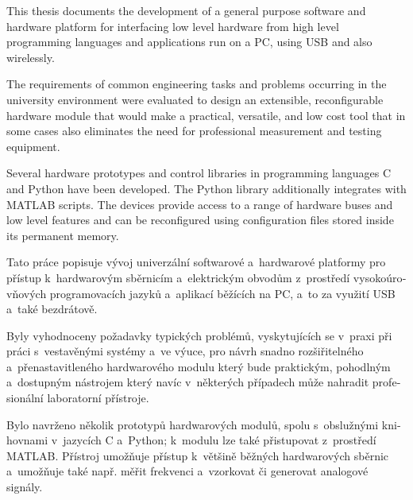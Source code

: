 
\begin{abstract-english}
This thesis documents the development of a general purpose software and hardware platform for interfacing low level hardware from high level programming languages and applications run on a PC, using USB and also wirelessly.

The requirements of common engineering tasks and problems occurring in the university environment were evaluated to design an extensible, reconfigurable hardware module that would make a practical, versatile, and low cost tool that in some cases also eliminates the need for professional measurement and testing equipment.

Several hardware prototypes and control libraries in programming languages C and Python have been developed. The Python library additionally integrates with MATLAB scripts. The devices provide access to a range of hardware buses and low level features and can be reconfigured using configuration files stored inside its permanent memory.
\end{abstract-english}

\begin{abstract-czech}
\begin{otherlanguage}{czech}
Tato práce popisuje vývoj univerzální softwarové a~hardwarové platformy pro přístup k~hardwarovým sběrnicím a~elektrickým obvodům z~prostředí vysokoúrovňových programovacích jazyků a~aplikací běžících na PC, a~to za využití USB a~také bezdrátově.

Byly vyhodnoceny požadavky typických problémů, vyskytujících se v~praxi při práci s~vestavěnými systémy a~ve výuce, pro návrh snadno rozšiřitelného a~přenastavitleného hardwarového modulu který bude praktickým, pohodlným a~dostupným nástrojem který navíc v~některých případech může nahradit profesionální laboratorní přístroje.

Bylo navrženo několik prototypů hardwarových modulů, spolu s~obslužnými knihovnami v~jazycích C a~Python; k~modulu lze také přistupovat z~prostředí MATLAB. Přístroj umožňuje přístup k~většině běžných hardwarových sběrnic a~umožňuje také např. měřit frekvenci a~vzorkovat či generovat analogové signály.
\end{otherlanguage}
\end{abstract-czech}

